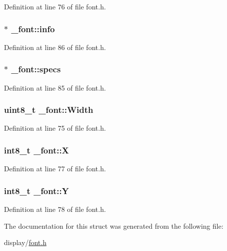 Definition at line 76 of file font.\-h.

\hypertarget{struct__font_abf134e8a44e707d3b4e83ab76c952ed9}{
\subsubsection[{info}]{ $\ast$ \-\_\-font\-::info}}\label{struct__font_abf134e8a44e707d3b4e83ab76c952ed9}


Definition at line 86 of file font.\-h.

\hypertarget{struct__font_a76b5b07cf75a869627eca27d7a32836a}{
\subsubsection[{specs}]{ $\ast$ \-\_\-font\-::specs}}\label{struct__font_a76b5b07cf75a869627eca27d7a32836a}


Definition at line 85 of file font.\-h.

\hypertarget{struct__font_ae3d3b48670f1bf4bf6dbf42794f81b31}{
\subsubsection[{Width}]{\setlength{\rightskip}{0pt plus 5cm}uint8\-\_\-t \-\_\-font\-::\-Width}}\label{struct__font_ae3d3b48670f1bf4bf6dbf42794f81b31}


Definition at line 75 of file font.\-h.

\hypertarget{struct__font_a64a08fdbdaa19418a9b7a34a2db33150}{
\subsubsection[{X}]{\setlength{\rightskip}{0pt plus 5cm}int8\-\_\-t \-\_\-font\-::\-X}}\label{struct__font_a64a08fdbdaa19418a9b7a34a2db33150}


Definition at line 77 of file font.\-h.

\hypertarget{struct__font_a3c9fee9cfcc713b1aac812c14dd9a36a}{
\subsubsection[{Y}]{\setlength{\rightskip}{0pt plus 5cm}int8\-\_\-t \-\_\-font\-::\-Y}}\label{struct__font_a3c9fee9cfcc713b1aac812c14dd9a36a}


Definition at line 78 of file font.\-h.



The documentation for this struct was generated from the following file\-:\begin{DoxyCompactItemize}
\item 
display/\hyperlink{display_2font_8h}{font.\-h}\end{DoxyCompactItemize}
